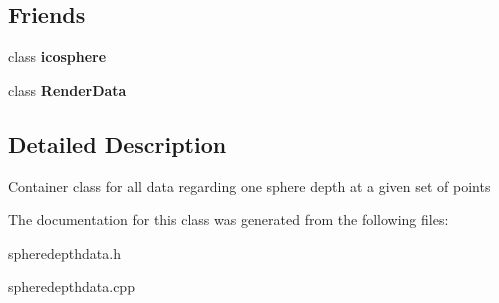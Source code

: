\subsection*{Friends}
\begin{DoxyCompactItemize}
\item 
\mbox{\label{class_sphere_depth_data_a965765d9b47dfa6a5464d3e5cc39a66c}} 
class {\bfseries icosphere}
\item 
\mbox{\label{class_sphere_depth_data_a85dbb35e50f4a9c4a1d0f0c783959bdb}} 
class {\bfseries Render\+Data}
\end{DoxyCompactItemize}


\subsection{Detailed Description}
Container class for all data regarding one sphere depth at a given set of points 

The documentation for this class was generated from the following files\+:\begin{DoxyCompactItemize}
\item 
spheredepthdata.\+h\item 
spheredepthdata.\+cpp\end{DoxyCompactItemize}
